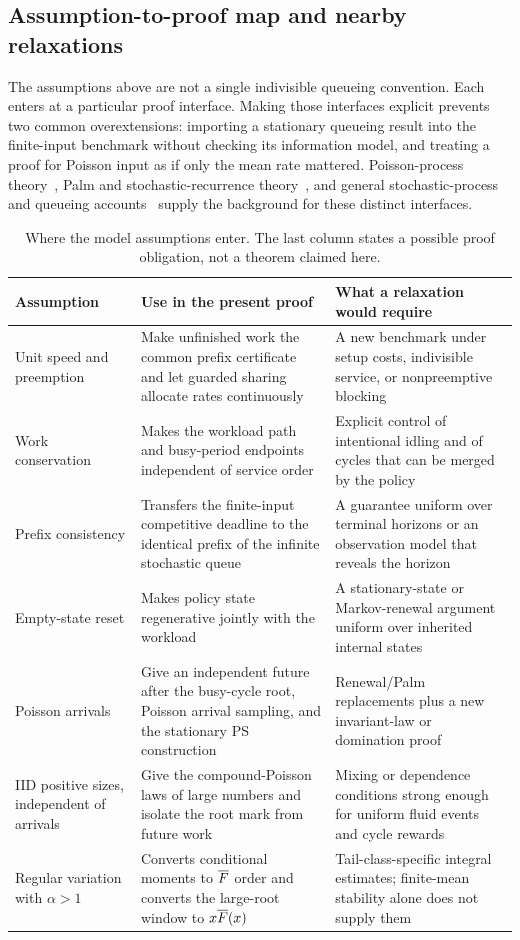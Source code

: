 \subsection{Assumption-to-proof map and nearby relaxations}\label{sec:assumption-map}
The assumptions above are not a single indivisible queueing convention. Each enters at a particular proof interface. Making those interfaces explicit prevents two common overextensions: importing a stationary queueing result into the finite-input benchmark without checking its information model, and treating a proof for Poisson input as if only the mean rate mattered. Poisson-process theory~\cite{kingman1993}, Palm and stochastic-recurrence theory~\cite{baccelli2003}, and general stochastic-process and queueing accounts~\cite{bremaud2020,harcholbalter2013} supply the background for these distinct interfaces.

\begin{table}[t]
\centering
\small
\caption{Where the model assumptions enter.  The last column states a possible proof obligation, not a theorem claimed here.}\label{tab:assumption-map}
\begin{tabular}{@{}L{0.19\textwidth}L{0.36\textwidth}L{0.35\textwidth}@{}}
\toprule
Assumption & Use in the present proof & What a relaxation would require\\
\midrule
Unit speed and preemption & Make unfinished work the common prefix certificate and let guarded sharing allocate rates continuously & A new benchmark under setup costs, indivisible service, or nonpreemptive blocking\\
Work conservation & Makes the workload path and busy-period endpoints independent of service order & Explicit control of intentional idling and of cycles that can be merged by the policy\\
Prefix consistency & Transfers the finite-input competitive deadline to the identical prefix of the infinite stochastic queue & A guarantee uniform over terminal horizons or an observation model that reveals the horizon\\
Empty-state reset & Makes policy state regenerative jointly with the workload & A stationary-state or Markov-renewal argument uniform over inherited internal states\\
Poisson arrivals & Give an independent future after the busy-cycle root, Poisson arrival sampling, and the stationary PS construction & Renewal/Palm replacements plus a new invariant-law or domination proof\\
IID positive sizes, independent of arrivals & Give the compound-Poisson laws of large numbers and isolate the root mark from future work & Mixing or dependence conditions strong enough for uniform fluid events and cycle rewards\\
Regular variation with $\alpha>1$ & Converts conditional moments to $\overline F$ order and converts the large-root window to $x\overline F(x)$ & Tail-class-specific integral estimates; finite-mean stability alone does not supply them\\
\bottomrule
\end{tabular}
\end{table}


